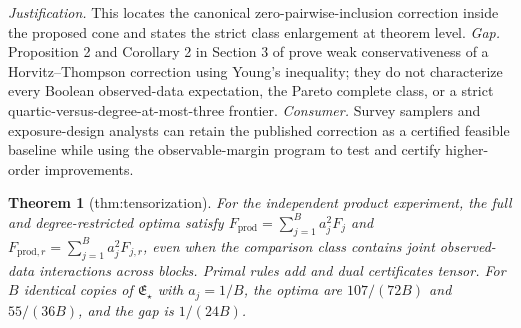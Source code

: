 \documentclass{article}
\newtheorem{theorem}{Theorem}
\begin{document}
\par\smallskip\noindent \textit{Justification.} This locates the canonical zero-pairwise-inclusion correction inside the proposed cone and states the strict class enlargement at theorem level. \textit{Gap.} Proposition 2 and Corollary 2 in Section 3 of \cite{AronowSamii2013} prove weak conservativeness of a Horvitz--Thompson correction using Young's inequality; they do not characterize every Boolean observed-data expectation, the Pareto complete class, or a strict quartic-versus-degree-at-most-three frontier. \textit{Consumer.} Survey samplers and exposure-design analysts can retain the published correction as a certified feasible baseline while using the observable-margin program to test and certify higher-order improvements.

\begin{theorem}[thm:tensorization]\label{thm:tensorization}
For the independent product experiment, the full and degree-restricted optima satisfy \(F_{\mathrm{prod}}=\sum_{j=1}^Ba_j^2F_j\) and \(F_{\mathrm{prod},r}=\sum_{j=1}^Ba_j^2F_{j,r}\), even when the comparison class contains joint observed-data interactions across blocks. Primal rules add and dual certificates tensor. For \(B\) identical copies of \(\mathfrak E_\star\) with \(a_j=1/B\), the optima are \(107/(72B)\) and \(55/(36B)\), and the gap is \(1/(24B)\).
\end{theorem}
\end{document}
